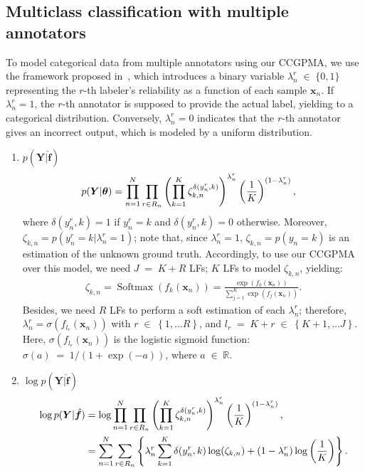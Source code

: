\documentclass[9pt]{article}
\providecommand{\ve}[1]{{\bm{#1}}}%
\providecommand{\mat}[1]{{\bm{#1}}} %
\newcommand{\Real}{\mathbb{R}}
\DeclareMathOperator{\en}{\!\,\in\!\,}
\DeclareMathOperator{\igual}{\!\,=\!\,}
\providecommand{\ve}[1]{{\mathbf{#1}}}
\providecommand{\mat}[1]{{\mathbf{#1}}}
\begin{document}
\subsection{Multiclass classification with multiple annotators}\label{sec:MC1}
To model categorical data from multiple annotators using our CCGPMA, we use the framework proposed in~\cite{rodrigues2013learning}, which introduces a binary variable $\lambda_n^r\en \{0,1\}$ representing the $r$-th labeler's reliability as a function of each sample $\ve{x}_n$. If $\lambda_n^r=1$, the $r$-th annotator is supposed to provide the actual label, yielding to a categorical distribution. Conversely, $\lambda_n^r=0$ indicates that the $r$-th annotator gives an incorrect output, which is modeled by a uniform distribution.
\begin{enumerate}
	\item $ p(\mat{Y}|\hat{\ve{f}})$
	\begin{align}
    \label{eq:ClasLik}
     p(\mat{Y}|\bm{\theta}) &=\notag \prod^N_{n=1}\prod_{r\in R_n}\left(\prod_{k=1}^{K}\zeta_{k,n}^{\delta(y_n^r,k)}\right)^{{\lambda}_n^r}\left(\frac{1}{K}\right)^{(1-{\lambda}_n^r)},
    \end{align}
    where $\delta(y_n^r,k)=1$ if $y_n^r=k$ and $\delta(y_n^r,k)=0$ otherwise. Moreover, $\zeta_{k,n}=p(y_n^r=k|{\lambda}_n^r=1)$; note that, since ${\lambda}_n^r=1$, $\zeta_{k,n}=p(y_n=k)$ is an estimation of the unknown ground truth. Accordingly, to use our CCGPMA over this model, we need $J\igual K+R$ LFs; $K$ LFs to model $\zeta_{k,n}$, yielding:
    \begin{align}
    \zeta_{k,n} =\operatorname{Softmax}(f_k(\ve{x}_n))= \frac{\exp(f_k(\ve{x}_n))}{\sum_{j=1}^{K}\exp(f_j(\ve{x}_n))}.
    \end{align}
    Besides, we need $R$ LFs to perform a soft estimation of each ${\lambda}_n^r$; therefore, ${\lambda}_n^r=\sigma(f_{l_r}(\ve{x}_n))$ with $r\en \left\{1, \dots R\right\}$, and $l_r \igual K+r \en \left\{K+1, \dots J\right\}$. Here, $\sigma(f_{l_r}(\ve{x}_n))$ is the logistic sigmoid function: $\sigma(a)\igual{1}/{(1+\exp(-a))}$, where $a\en\Real.$ 
	\item $\log p(\mat{Y}|\hat{\ve{f}})$
	\begin{align}
	\notag \log p(\mat{Y}|\hat{\ve{f}}) &= \log \prod^N_{n=1}\prod_{r\in R_n}\left(\prod_{k=1}^{K}\zeta_{k,n}^{\delta(y_n^r,k)}\right)^{{\lambda}_n^r}\left(\frac{1}{K}\right)^{(1-{\lambda}_n^r)},\\
	&=\sum^N_{n=1}\sum_{r\in R_n}\left\{{\lambda}_n^r\sum_{k=1}^{K}\delta(y_n^r,k)\log(\zeta_{k,n}) + (1- {\lambda}_n^r)\log\left(\frac{1}{K}\right)\right\}.
	\end{align}
	

\end{enumerate}
\end{document}
